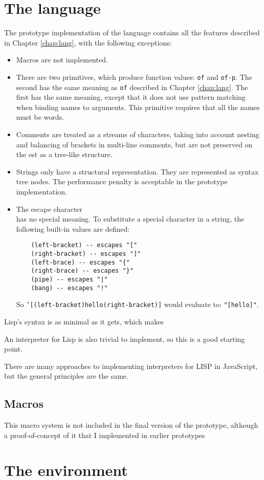 \section{The language}
The prototype implementation of the language contains all the features described in Chapter \ref{chap:lang}, with the following exceptions:
\begin{itemize}
    \item Macros are not implemented.
    \item There are two primitives, which produce function values: \texttt{of} and \texttt{of-p}. The second has the same meaning as \texttt{of} described in Chapter \ref{chap:lang}. The first has the same meaning, except that it does not use pattern matching when binding names to arguments. This primitive requires that all the names must be words.
    \item Comments are treated as a streams of characters, taking into account nesting and balancing of brackets in multi-line comments, but are not preserved on the \acrshort{est} as a tree-like structure.
    \item Strings only have a structural representation. They are represented as syntax tree nodes. The performance penalty is acceptable in the prototype implementation.
    \item The escape character \texttt{\\} has no special meaning. To substitute a special character in a string, the following built-in values are defined:
    \begin{lstlisting}
    (left-bracket) -- escapes "["
    (right-bracket) -- escapes "]"
    (left-brace) -- escapes "{"
    (right-brace) -- escapes "}"
    (pipe) -- escapes "|"
    (bang) -- escapes "!"
    \end{lstlisting}
    
    So \texttt{'[(left-bracket)hello(right-bracket)]} would evaluate to: \texttt{"[hello]"}.
\end{itemize}

Lisp's syntax is as minimal as it gets\cite{syntaxation}, which makes 

An interpreter for Lisp is also trivial to implement, so this is a good starting
point.

There are many approaches to implementing interpreters for LISP in
JavaScript\cite{js_lisps}, but the general principles are the same.

\subsection{Macros}
This
macro system is not included in the final version of the prototype, although a
proof-of-concept of it that I implemented in earlier prototypes

\section{The environment}

